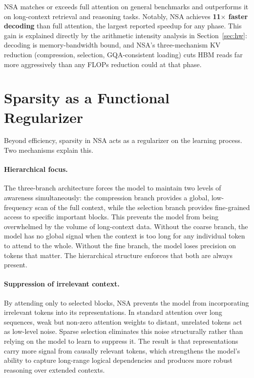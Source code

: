 \documentclass[11pt,letterpaper]{article}
\begin{document}
NSA matches or exceeds full attention on general benchmarks and outperforms it on long-context
retrieval and reasoning tasks.
Notably, NSA achieves \textbf{11$\times$ faster decoding} than full attention, the largest
reported speedup for any phase. This gain is explained directly by the arithmetic intensity
analysis in Section~\ref{sec:hw}: decoding is memory-bandwidth bound, and NSA's three-mechanism
KV reduction (compression, selection, GQA-consistent loading) cuts HBM reads far more
aggressively than any FLOPs reduction could at that phase.

\section{Sparsity as a Functional Regularizer}

Beyond efficiency, sparsity in NSA acts as a regularizer on the learning process.
Two mechanisms explain this.

\paragraph{Hierarchical focus.}
The three-branch architecture forces the model to maintain two levels of awareness simultaneously:
the compression branch provides a global, low-frequency scan of the full context, while the
selection branch provides fine-grained access to specific important blocks.
This prevents the model from being overwhelmed by the volume of long-context data.
Without the coarse branch, the model has no global signal when the context is too long for
any individual token to attend to the whole.
Without the fine branch, the model loses precision on tokens that matter.
The hierarchical structure enforces that both are always present.

\paragraph{Suppression of irrelevant context.}
By attending only to selected blocks, NSA prevents the model from incorporating irrelevant
tokens into its representations.
In standard attention over long sequences, weak but non-zero attention weights to distant,
unrelated tokens act as low-level noise.
Sparse selection eliminates this noise structurally rather than relying on the model to learn
to suppress it.
The result is that representations carry more signal from causally relevant tokens, which
strengthens the model's ability to capture long-range logical dependencies and produces more
robust reasoning over extended contexts.
\end{document}

